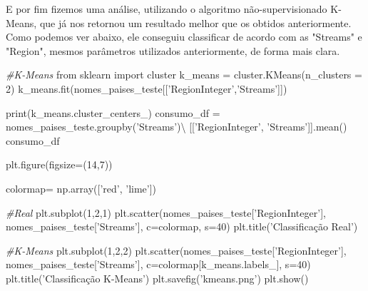 \documentclass[11pt]{article}
\newenvironment{Shaded}{}{}
\newcommand{\DecValTok}[1]{\textcolor[rgb]{0.25,0.63,0.44}{{#1}}}
\newcommand{\StringTok}[1]{\textcolor[rgb]{0.25,0.44,0.63}{{#1}}}
\newcommand{\CommentTok}[1]{\textcolor[rgb]{0.38,0.63,0.69}{\textit{{#1}}}}
\newcommand{\NormalTok}[1]{{#1}}
\newcommand{\ImportTok}[1]{{#1}}
\newcommand{\OperatorTok}[1]{\textcolor[rgb]{0.40,0.40,0.40}{{#1}}}
\newcommand{\BuiltInTok}[1]{{#1}}
\begin{document}
    E por fim fizemos uma análise, utilizando o algoritmo não-supervisionado
K-Means, que já nos retornou um resultado melhor que os obtidos
anteriormente. Como podemos ver abaixo, ele conseguiu classificar de
acordo com as "Streams" e "Region", mesmos parâmetros utilizados
anteriormente, de forma mais clara.

    \begin{Shaded}
\begin{Highlighting}[]
    \CommentTok{#K-Means}
    \ImportTok{from}\NormalTok{ sklearn }\ImportTok{import}\NormalTok{ cluster}
\NormalTok{    k_means }\OperatorTok{=}\NormalTok{ cluster.KMeans(n_clusters }\OperatorTok{=} \DecValTok{2}\NormalTok{)}
\NormalTok{    k_means.fit(nomes_paises_teste[[}\StringTok{'RegionInteger'}\NormalTok{,}\StringTok{'Streams'}\NormalTok{]])}
\end{Highlighting}
\end{Shaded}

    \begin{Shaded}
\begin{Highlighting}[]
    \BuiltInTok{print}\NormalTok{(k_means.cluster_centers_)}
\NormalTok{    consumo_df }\OperatorTok{=}\NormalTok{ nomes_paises_teste.groupby(}\StringTok{'Streams'}\NormalTok{)}\OperatorTok{\textbackslash{}}
\NormalTok{        [[}\StringTok{'RegionInteger'}\NormalTok{, }\StringTok{'Streams'}\NormalTok{]].mean()}
\NormalTok{    consumo_df}
\end{Highlighting}
\end{Shaded}

    \begin{Shaded}
\begin{Highlighting}[]
\NormalTok{    plt.figure(figsize}\OperatorTok{=}\NormalTok{(}\DecValTok{14}\NormalTok{,}\DecValTok{7}\NormalTok{))}

\NormalTok{    colormap}\OperatorTok{=}\NormalTok{ np.array([}\StringTok{'red'}\NormalTok{, }\StringTok{'lime'}\NormalTok{])}

    \CommentTok{#Real}
\NormalTok{    plt.subplot(}\DecValTok{1}\NormalTok{,}\DecValTok{2}\NormalTok{,}\DecValTok{1}\NormalTok{)}
\NormalTok{    plt.scatter(nomes_paises_teste[}\StringTok{'RegionInteger'}\NormalTok{], nomes_paises_teste[}\StringTok{'Streams'}\NormalTok{], c}\OperatorTok{=}\NormalTok{colormap, s}\OperatorTok{=}\DecValTok{40}\NormalTok{)}
\NormalTok{    plt.title(}\StringTok{'Classificação Real'}\NormalTok{)}

    \CommentTok{#K-Means}
\NormalTok{    plt.subplot(}\DecValTok{1}\NormalTok{,}\DecValTok{2}\NormalTok{,}\DecValTok{2}\NormalTok{)}
\NormalTok{    plt.scatter(nomes_paises_teste[}\StringTok{'RegionInteger'}\NormalTok{], nomes_paises_teste[}\StringTok{'Streams'}\NormalTok{], c}\OperatorTok{=}\NormalTok{colormap[k_means.labels_], s}\OperatorTok{=}\DecValTok{40}\NormalTok{)}
\NormalTok{    plt.title(}\StringTok{'Classificação K-Means'}\NormalTok{)}
\NormalTok{    plt.savefig(}\StringTok{'kmeans.png'}\NormalTok{)}
\NormalTok{    plt.show()}
\end{Highlighting}
\end{Shaded}
\end{document}
